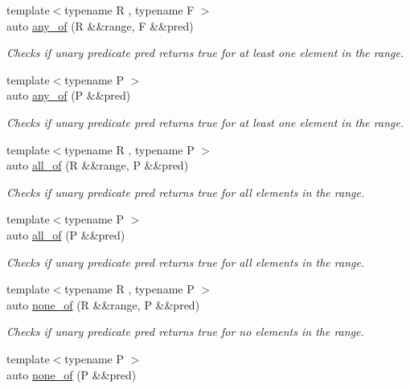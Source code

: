 \begin{DoxyCompactItemize}
{\footnotesize template$<$typename R , typename F $>$ }\\auto \mbox{\hyperlink{namespacerah_a025b40120fb932b244ae35963d7af203}{any\+\_\+of}} (R \&\&range, F \&\&pred)
\begin{DoxyCompactList}\small\item\em Checks if unary predicate pred returns true for at least one element in the range. \end{DoxyCompactList}\item 
{\footnotesize template$<$typename P $>$ }\\auto \mbox{\hyperlink{namespacerah_aa3f330b2354859d8a9e6df794a1e7a1a}{any\+\_\+of}} (P \&\&pred)
\begin{DoxyCompactList}\small\item\em Checks if unary predicate pred returns true for at least one element in the range. \end{DoxyCompactList}\item 
{\footnotesize template$<$typename R , typename P $>$ }\\auto \mbox{\hyperlink{namespacerah_a182308962c8123dcbe4e4665eaef105c}{all\+\_\+of}} (R \&\&range, P \&\&pred)
\begin{DoxyCompactList}\small\item\em Checks if unary predicate pred returns true for all elements in the range. \end{DoxyCompactList}\item 
{\footnotesize template$<$typename P $>$ }\\auto \mbox{\hyperlink{namespacerah_a4066165c960917a330beeed75a0f96e7}{all\+\_\+of}} (P \&\&pred)
\begin{DoxyCompactList}\small\item\em Checks if unary predicate pred returns true for all elements in the range. \end{DoxyCompactList}\item 
{\footnotesize template$<$typename R , typename P $>$ }\\auto \mbox{\hyperlink{namespacerah_a792ab1d0886062eaf30de07cac4b6a5b}{none\+\_\+of}} (R \&\&range, P \&\&pred)
\begin{DoxyCompactList}\small\item\em Checks if unary predicate pred returns true for no elements in the range. \end{DoxyCompactList}\item 
{\footnotesize template$<$typename P $>$ }\\auto \mbox{\hyperlink{namespacerah_aa05e58774ee8e9e05cd3e6ed2a2fa372}{none\+\_\+of}} (P \&\&pred)

\end{DoxyCompactItemize}
